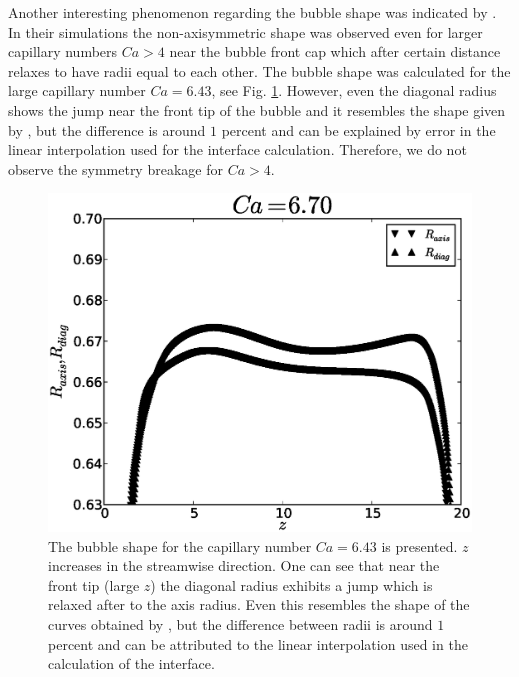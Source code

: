 \documentclass[preprint,12pt]{elsarticle}
\begin{document}
Another interesting phenomenon regarding the bubble shape was indicated by \citet{heil-threedim}. In
their simulations the non-axisymmetric shape was observed even for larger capillary numbers $Ca>4$
near
the bubble front cap which after certain distance relaxes to have radii equal to each other. The
bubble shape was calculated for the large capillary number $Ca=6.43$, see Fig.
\ref{fig:bubble:ca:large}. However, even the diagonal radius shows the jump near the front tip of
the bubble and it resembles the shape given by \citet{heil-threedim}, but the difference is around
$1$ percent and can be explained by error in the linear interpolation used for the
interface
calculation. Therefore, we do not observe the symmetry breakage for $Ca>4$. 
\begin{figure}[ht]
\includegraphics[width=\textwidth]{Figures/bubble_ca_large.eps}
\caption{The bubble shape for the capillary number $Ca=6.43$ is presented. $z$ increases in the
streamwise direction. One can see that near the front tip (large $z$) the diagonal radius exhibits
a jump which is relaxed after to the axis radius. Even this resembles
the shape of the curves obtained by \citet{heil-threedim}, but the
difference between radii is around $1$ percent and can be attributed to
the linear interpolation used in the calculation of the interface.\label{fig:bubble:ca:large}}
\end{figure}
\end{document}
